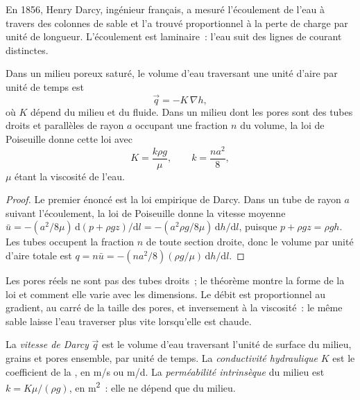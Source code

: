 En 1856, Henry Darcy, ingénieur français, a mesuré l'écoulement de l'eau à travers des colonnes
de sable et l'a trouvé proportionnel à la perte de charge par unité de
longueur. L'écoulement est laminaire~: l'eau suit des lignes de courant distinctes.

\begin{theorem}\label{thm:b3:hydrogeology:darcy}
Dans un milieu poreux saturé, le volume d'eau traversant une unité d'aire par unité
de temps est
\[
\vec q = -K\,\nabla h ,
\]
où $K$ dépend du milieu et du fluide. Dans un milieu dont les pores
sont des tubes droits et parallèles de rayon $a$ occupant une fraction $n$ du
volume, la loi de Poiseuille donne cette loi avec
\[
K = \frac{k\rho g}{\mu}, \qquad k = \frac{na^2}{8} ,
\]
$\mu$ étant la viscosité de l'eau.
\end{theorem}

\begin{proof}
Le premier énoncé est la loi empirique de Darcy. Dans un tube de rayon $a$
suivant l'écoulement, la loi de Poiseuille donne la vitesse moyenne $\bar u =
-(a^2/8\mu)\,\mathrm d(p + \rho gz)/\mathrm dl = -(a^2\rho g/8\mu)\,\mathrm
dh/\mathrm dl$, puisque $p + \rho gz = \rho g h$. Les tubes occupent la
fraction $n$ de toute section droite, donc le volume par unité d'aire totale est
$q = n\bar u = -(na^2/8)(\rho g/\mu)\,\mathrm dh/\mathrm dl$.
\end{proof}

Les pores réels ne sont pas des tubes droits~; le théorème montre la forme de la loi
et comment elle varie avec les dimensions. Le débit est proportionnel au gradient, au carré
de la taille des pores, et inversement à la viscosité~: le même sable
laisse l'eau traverser plus vite lorsqu'elle est chaude.

\begin{definition}\label{def:b3:hydrogeology:darcy}
La \emph{vitesse de Darcy} $\vec q$ est le
volume d'eau traversant l'unité de surface du milieu, grains et pores
ensemble, par unité de temps. La \emph{conductivité
hydraulique} $K$ est le coefficient de
la , en \unit{m/s} ou \unit{m/d}. La \emph{perméabilité
intrinsèque} du milieu est $k =
K\mu/(\rho g)$, en \unit{m^2}~: elle ne dépend que du milieu.
\end{definition}

